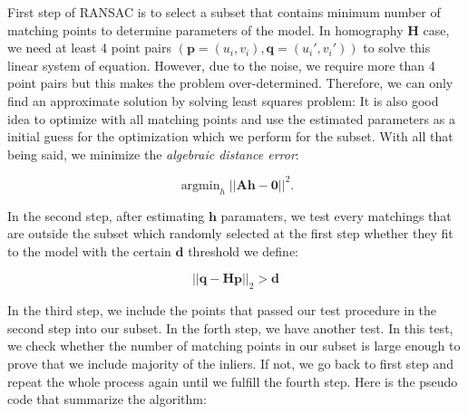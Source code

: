 \documentclass[a4paper]{report}
\numberwithin{figure}{section}
\newcommand{\argmin}{\mathop{\mathrm{argmin}}}
\begin{document}
First step of RANSAC is to select a subset that contains 
minimum number of matching points to 
determine parameters of the model. In homography $\mathbf{H}$ case, we need at least 
4 point pairs $(\mathbf{p}=(u_i,v_i),\mathbf{q}=(u_i',v_i'))$ to solve 
this linear system of equation. However, due to the noise, we require more than 
4 point pairs but this makes the problem over-determined. Therefore, 
we can only find an approximate solution by solving least squares problem:
It is also good idea to optimize with all matching points and use 
the estimated parameters as a initial guess for the optimization 
which we perform for the subset. With all that being said, we minimize the 
\textit{algebraic distance error}:

\begin{equation}
\argmin_h || \mathbf{Ah-0}||^2.
\end{equation}

In the second step, 
after estimating $\mathbf{h}$ paramaters, we test every matchings that are 
outside the subset which randomly selected at the first step whether 
they fit to the model with the certain $\mathbf{d}$ threshold we define:

\begin{equation}
  ||\mathbf{q} - \mathbf{H}\mathbf{p}||_2 > \mathbf{d} 
\end{equation}

In the third step, we include the points 
that passed our test procedure in the second step into our subset. In the 
forth step, we have another test. In this test, we check whether the number of 
matching points in our subset is large enough to prove that we include 
majority of the inliers. If not, we go back to first step and repeat the 
whole process again until we fulfill the fourth step. Here is the pseudo code 
that summarize the algorithm:
\end{document}
